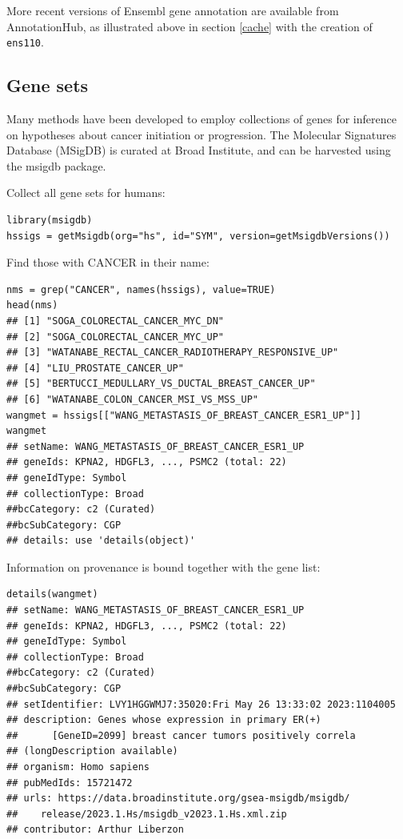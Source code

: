 More recent versions of Ensembl gene annotation are available
from AnnotationHub, as illustrated above in section \ref{cache} with
the creation of \texttt{ens110}.

\subsection{Gene sets}\label{gene-sets}

Many methods have been developed to employ collections
of genes for inference on hypotheses about cancer
initiation or progression. The Molecular Signatures Database (MSigDB)
is curated at Broad Institute, and can be harvested
using the msigdb package.

Collect all gene sets for humans:

\begin{shaded}
\begin{verbatim}
library(msigdb)
hssigs = getMsigdb(org="hs", id="SYM", version=getMsigdbVersions())
\end{verbatim}
\end{shaded}

Find those with CANCER in their name:

\begin{shaded}
\begin{verbatim}
nms = grep("CANCER", names(hssigs), value=TRUE)
head(nms)
## [1] "SOGA_COLORECTAL_CANCER_MYC_DN"
## [2] "SOGA_COLORECTAL_CANCER_MYC_UP"
## [3] "WATANABE_RECTAL_CANCER_RADIOTHERAPY_RESPONSIVE_UP"
## [4] "LIU_PROSTATE_CANCER_UP"
## [5] "BERTUCCI_MEDULLARY_VS_DUCTAL_BREAST_CANCER_UP"
## [6] "WATANABE_COLON_CANCER_MSI_VS_MSS_UP"
wangmet = hssigs[["WANG_METASTASIS_OF_BREAST_CANCER_ESR1_UP"]]
wangmet
## setName: WANG_METASTASIS_OF_BREAST_CANCER_ESR1_UP
## geneIds: KPNA2, HDGFL3, ..., PSMC2 (total: 22)
## geneIdType: Symbol
## collectionType: Broad
##bcCategory: c2 (Curated)
##bcSubCategory: CGP
## details: use 'details(object)'
\end{verbatim}
\end{shaded}

Information on provenance is bound together with the gene list:

\begin{shaded}
\begin{verbatim}
details(wangmet)
## setName: WANG_METASTASIS_OF_BREAST_CANCER_ESR1_UP
## geneIds: KPNA2, HDGFL3, ..., PSMC2 (total: 22)
## geneIdType: Symbol
## collectionType: Broad
##bcCategory: c2 (Curated)
##bcSubCategory: CGP
## setIdentifier: LVY1HGGWMJ7:35020:Fri May 26 13:33:02 2023:1104005
## description: Genes whose expression in primary ER(+) 
##      [GeneID=2099] breast cancer tumors positively correla
## (longDescription available)
## organism: Homo sapiens
## pubMedIds: 15721472
## urls: https://data.broadinstitute.org/gsea-msigdb/msigdb/
##    release/2023.1.Hs/msigdb_v2023.1.Hs.xml.zip
## contributor: Arthur Liberzon
\end{verbatim}
\end{shaded}

